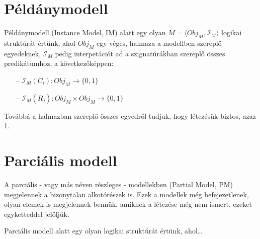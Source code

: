 \begin{definition}[Metamodell]
\begin{itemize}
 
\end{itemize}

\end{definition}


\section{Példánymodell}
\begin{definition}[Példánymodell]
Példánymodell (Instance Model, IM) alatt egy olyan $M = \langle Obj_M, \mathcal{I}_M \rangle$ logikai struktúrát értünk, ahol $Obj_M $ egy véges, halmaza a modellben szereplő egyedeknek, $\mathcal{I}_M$ pedig interpetációt ad a szignatúrákban szereplő összes predikátumhoz, a következőképpen:
\begin{itemize}
\item[--] $\mathcal{I}_M(C_i) : Obj_M \rightarrow \{0, 1\}$
\item[--] $\mathcal{I}_M(R_j) : Obj_M \times Obj_M \rightarrow \{0, 1\}$
\end{itemize}
Továbbá a halmazban szereplő összes egyedről tudjuk, hogy létezésük biztos, azaz 1.
\end{definition}

\section{Parciális modell}

A parciális - vagy más néven részleges - modellekben (Partial Model, PM) megjelennek a bizonytalan alkotórészek is.
Ezek a modellek még befejezetlenek, olyan elemek is megjelennek bennük, amiknek a létezése még nem ismert, ezeket egyketteddel jelöljük.

\begin{definition}
Parciális modell alatt egy olyan logikai struktúrát értünk, ahol\ldots
\end{definition}